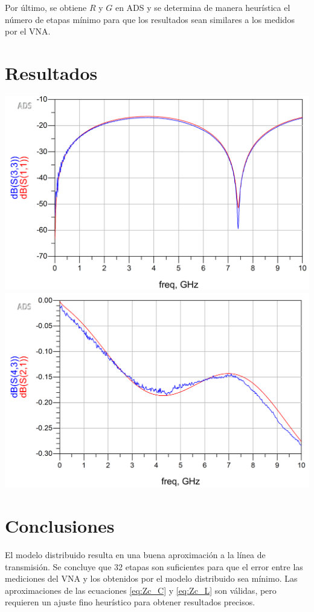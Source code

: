 \documentclass{article}   %
\theoremstyle{mytheoremstyle}
\theoremstyle{mytheoremstyle}
\theoremstyle{myproblemstyle}
\begin{document}
    \begin{minipage}{0.49\textwidth}   %
        Por último, se obtiene $R$ y $G$ en ADS y se determina de manera heurística el número de 
        etapas mínimo para que los resultados sean similares a los medidos por el VNA.
        
        {\centering\section*{\large Resultados}}
        \includegraphics[width=\textwidth]{figures/magnitud_s11.png}
        \label{fig:gamma_real}
        \includegraphics[width=\textwidth]{figures/s21_tarea6.png}
        \label{fig:gamma_imag}

        {\centering\section*{\large Conclusiones}}
        El modelo distribuido resulta en una buena aproximación a la línea de transmisión. Se concluye que 32 etapas son suficientes para 
        que el error entre las mediciones del VNA y los obtenidos por el modelo distribuido sea mínimo. Las aproximaciones de las ecuaciones
        \eqref{eq:Zc_C} y \eqref{eq:Zc_L} son válidas, pero requieren un ajuste fino heurístico para obtener resultados precisos.
    \end{minipage}
\end{document}
